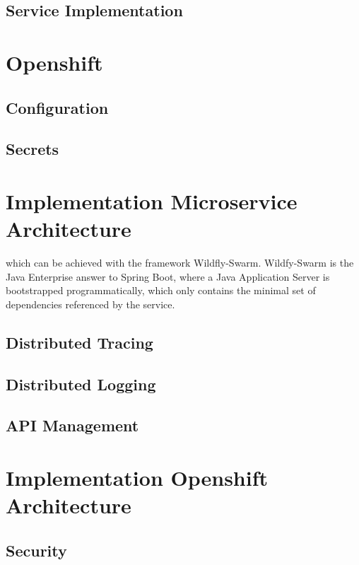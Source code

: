 \subsection{Service Implementation}
\label{sec:esbi-api-service}

\section{Openshift}
\label{sec:esbi-openshift}

\subsection{Configuration}
\label{sec:esbi-openshift-config}

\subsection{Secrets}
\label{sec:esbi-openshift-secrets}

\section{Implementation Microservice Architecture}
\label{sec:esbi-impl-services}
 which can be achieved with the framework Wildfly-Swarm. Wildfy-Swarm is the Java Enterprise answer to Spring Boot, where a Java Application Server is bootstrapped programmatically, which only contains the minimal set of dependencies referenced by the service. 

\subsection{Distributed Tracing}
\label{sec:esbi-impl-tracing}

\subsection{Distributed Logging}
\label{sec:esbi-impl-logging}

\subsection{API Management}
\label{sec:esboc-impl-api}

\section{Implementation Openshift Architecture}
\label{sec:esbi-impl-oc}

\subsection{Security}
\label{sec:esboc-impl-security}
